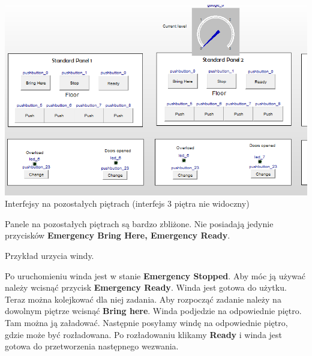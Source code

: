 \documentclass[a4paper,11pt]{article}
\begin{document}
    		\includegraphics{images/rGuiStd.PNG} Interfejsy na pozostałych piętrach (interfejs 3 piętra nie widoczny)
  	
  	
  	Panele na pozostałych piętrach są bardzo zbliżone. Nie posiadają jedynie przycisków \textbf{Emergency Bring Here, Emergency Ready}.
  	
  	
  	
  	
  	Przykład urzycia windy.
  	
  	Po uruchomieniu winda jest w stanie \textbf{Emergency Stopped}. Aby móc ją używać należy wcisnąć przycisk \textbf{Emergency Ready}.
  	Winda jest gotowa do użytku. Teraz można kolejkować dla niej zadania.
  	Aby rozpocząć zadanie należy na dowolnym piętrze wcisnąć \textbf{Bring here}. Winda podjedzie na odpowiednie piętro.
  	Tam można ją załadować. Następnie posyłamy windę na odpowiednie piętro, gdzie może być rozładowana. 
  	Po rozładowaniu klikamy \textbf{Ready} i winda jest gotowa do przetworzenia następnego wezwania.

    
\end{document}
